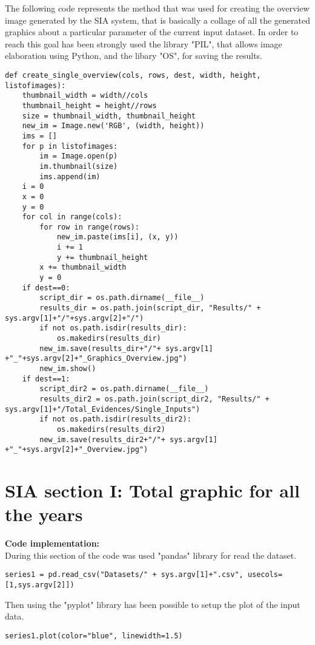 The following code represents the method that was used for creating the overview image generated by the SIA system, that is basically a collage of all the generated graphics about a particular parameter of the current input dataset. In order to reach this goal has been strongly used the library "PIL", that allows image elaboration using Python, and the libary "OS", for saving the results.
\begin{lstlisting}
def create_single_overview(cols, rows, dest, width, height, listofimages):
    thumbnail_width = width//cols
    thumbnail_height = height//rows
    size = thumbnail_width, thumbnail_height
    new_im = Image.new('RGB', (width, height))
    ims = []
    for p in listofimages:
        im = Image.open(p)
        im.thumbnail(size)
        ims.append(im)
    i = 0
    x = 0
    y = 0
    for col in range(cols):
        for row in range(rows):
            new_im.paste(ims[i], (x, y))
            i += 1
            y += thumbnail_height
        x += thumbnail_width
        y = 0
    if dest==0:
    	script_dir = os.path.dirname(__file__)
    	results_dir = os.path.join(script_dir, "Results/" + sys.argv[1]+"/"+sys.argv[2]+"/")
    	if not os.path.isdir(results_dir):
    		os.makedirs(results_dir)
        new_im.save(results_dir+"/"+ sys.argv[1] +"_"+sys.argv[2]+"_Graphics_Overview.jpg")
        new_im.show()
    if dest==1:
    	script_dir2 = os.path.dirname(__file__)
    	results_dir2 = os.path.join(script_dir2, "Results/" + sys.argv[1]+"/Total_Evidences/Single_Inputs")
    	if not os.path.isdir(results_dir2):
    		os.makedirs(results_dir2)
        new_im.save(results_dir2+"/"+ sys.argv[1] +"_"+sys.argv[2]+"_Overview.jpg")
\end{lstlisting}



\section{SIA section I: Total graphic for all the years}
\label{SIA_section_I}
\textbf{Code implementation:}\\
During this section of the code was used "pandas" library for read the dataset.
\begin{lstlisting}
series1 = pd.read_csv("Datasets/" + sys.argv[1]+".csv", usecols=[1,sys.argv[2]])
\end{lstlisting}

Then using the "pyplot" library has been possible to setup the plot of the input data.
\begin{lstlisting}
series1.plot(color="blue", linewidth=1.5)
\end{lstlisting}


